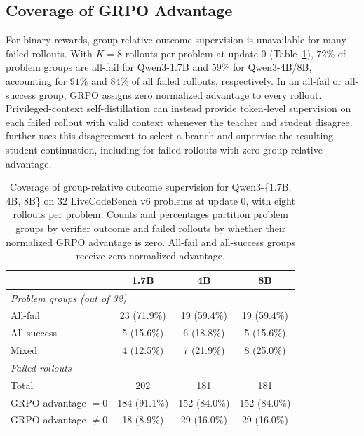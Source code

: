 \subsection{Coverage of GRPO Advantage}
\label{app:grpo}

For binary rewards, group-relative outcome supervision is unavailable for many failed rollouts. With $K=8$ rollouts per problem at update 0 (Table~\ref{tab:grpo-coverage}), $72\%$ of problem groups are all-fail for Qwen3-1.7B and $59\%$ for Qwen3-4B/8B, accounting for $91\%$ and $84\%$ of all failed rollouts, respectively. In an all-fail or all-success group, GRPO assigns zero normalized advantage to every rollout. Privileged-context self-distillation can instead provide token-level supervision on each failed rollout with valid context whenever the teacher and student disagree. \method{} further uses this disagreement to select a branch and supervise the resulting student continuation, including for failed rollouts with zero group-relative advantage.

\begin{table}[ht]
  \centering
\caption{Coverage of group-relative outcome supervision for Qwen3-\{1.7B, 4B, 8B\} on $32$ LiveCodeBench v6 problems at update 0, with eight rollouts per problem. Counts and percentages partition problem groups by verifier outcome and failed rollouts by whether their normalized GRPO advantage is zero. All-fail and all-success groups receive zero normalized advantage.}  \label{tab:grpo-coverage}
  \small
  \begin{tabular}{lccc}
    \toprule
    & {1.7B} & {4B} & {8B} \\
    \midrule
    \multicolumn{4}{l}{\textit{Problem groups (out of 32)}} \\
    \quad All-fail    & 23 (71.9\%) & 19 (59.4\%) & 19 (59.4\%) \\
    \quad All-success &  5 (15.6\%) &  6 (18.8\%) &  5 (15.6\%) \\
    \quad Mixed       &  4 (12.5\%) &  7 (21.9\%) &  8 (25.0\%) \\
    \midrule
    \multicolumn{4}{l}{\textit{Failed rollouts}} \\
    \quad Total              & 202 & 181 & 181 \\
    \quad GRPO advantage $=0$     & 184 (91.1\%) & 152 (84.0\%) & 152 (84.0\%) \\
    \quad GRPO advantage $\neq 0$ & 18 (8.9\%)  & 29 (16.0\%) & 29 (16.0\%) \\
    \bottomrule
  \end{tabular}
\end{table}

